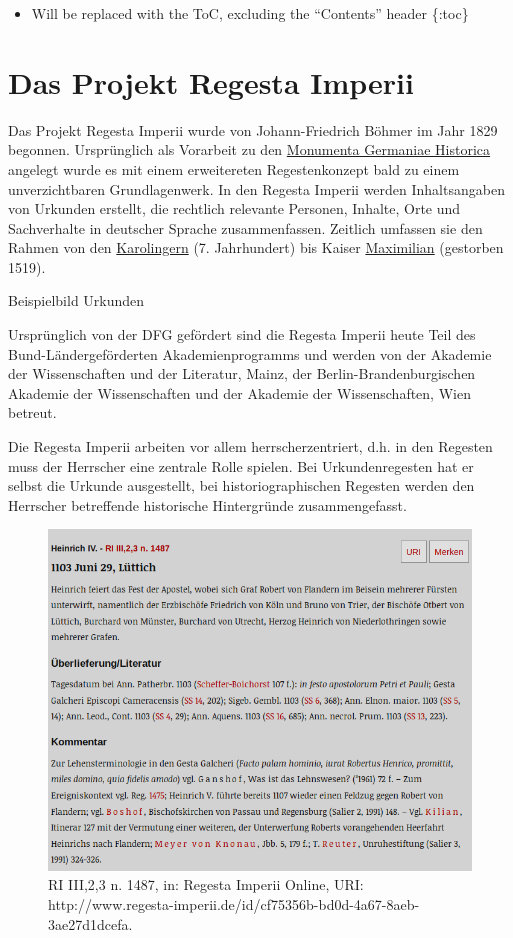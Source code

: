 \documentclass[ngerman,]{scrreprt}
\providecommand{\tightlist}{%
  \setlength{\itemsep}{0pt}\setlength{\parskip}{0pt}}
\begin{document}
\begin{itemize}
\tightlist
\item
  Will be replaced with the ToC, excluding the ``Contents'' header \{:toc\}
\end{itemize}

\section{Das Projekt Regesta Imperii}\label{das-projekt-regesta-imperii}

Das Projekt Regesta Imperii wurde von Johann-Friedrich Böhmer im Jahr 1829 begonnen. Ursprünglich als Vorarbeit zu den \href{https://www.mgh.de}{Monumenta Germaniae Historica} angelegt wurde es mit einem erweitereten Regestenkonzept bald zu einem unverzichtbaren Grundlagenwerk. In den Regesta Imperii werden Inhaltsangaben von Urkunden erstellt, die rechtlich relevante Personen, Inhalte, Orte und Sachverhalte in deutscher Sprache zusammenfassen. Zeitlich umfassen sie den Rahmen von den \href{https://de.wikipedia.org/wiki/Karolinger}{Karolingern} (7. Jahrhundert) bis Kaiser \href{https://de.wikipedia.org/wiki/Maximilian_I._(HRR)}{Maximilian} (gestorben 1519).

Beispielbild Urkunden

Ursprünglich von der DFG gefördert sind die Regesta Imperii heute Teil des Bund-Ländergeförderten Akademienprogramms und werden von der Akademie der Wissenschaften und der Literatur, Mainz, der Berlin-Brandenburgischen Akademie der Wissenschaften und der Akademie der Wissenschaften, Wien betreut.

Die Regesta Imperii arbeiten vor allem herrscherzentriert, d.h. in den Regesten muss der Herrscher eine zentrale Rolle spielen. Bei Urkundenregesten hat er selbst die Urkunde ausgestellt, bei historiographischen Regesten werden den Herrscher betreffende historische Hintergründe zusammengefasst.

\begin{figure}
\centering
\includegraphics{Bilder/RI2Graph/ReggH4-Nr-1487.png}
\caption{RI III,2,3 n. 1487, in: Regesta Imperii Online, URI: http://www.regesta-imperii.de/id/cf75356b-bd0d-4a67-8aeb-3ae27d1dcefa.}
\end{figure}
\end{document}

